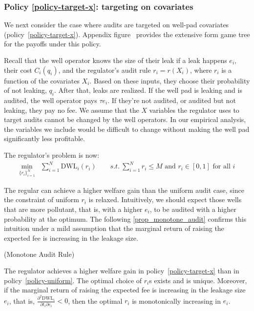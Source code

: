 \subsubsection{Policy \ref{policy-target-x}: targeting on covariates}

We next consider the case where audits are targeted on well-pad covariates (policy~\ref{policy-target-x}).
Appendix figure~\iftoggle{usexr}{\ref{fig:game-tree-target-x}}{A1} provides the extensive form game tree for the payoffs under this policy.

Recall that the well operator knows the size of their leak if a leak happens \(e_i\), their cost \(C_i(q_i)\), and the regulator's audit rule \(r_i = r(X_i)\), where \(r_i\) is a function of the covariates \(X_i\).
Based on these inputs, they choose their probability of not leaking, \(q_i\).
After that, leaks are realized.
If the well pad is leaking and is audited, the well operator pays \(\tau e_i\).
If they're not audited, or audited but not leaking, they pay no fee.
We assume that the \(X\) variables the regulator uses to target audits cannot be changed by the well operators.
In our empirical analysis, the variables we include would be difficult to change without making the well pad significantly less profitable.

The regulator's problem is now:
\begin{align*}
\min_{\{r_i\}^{N}_{i=1}} &  \sum^{N}_{i=1} \text{DWL}_i(r_i) \qquad
s.t.\ \sum^{N}_{i=1} r_i \leq M \text{ and } r_i \in [0, 1] \text{ for all } i
\end{align*}

The regular can achieve a higher welfare gain than the uniform audit case, since the constraint of uniform \(r_i\) is relaxed.
Intuitively, we should expect those wells that are more pollutant, that is, with a higher \(e_i\), to be audited with a higher probability at the optimum.
The following \autoref{prop_monotone_audit} confirms this intuition under a mild assumption that the marginal return of raising the expected fee is increasing in the leakage size.

\begin{proposition}{(Monotone Audit Rule)}
\label{prop_monotone_audit}

\noindent
The regulator achieves a higher welfare gain in policy~\ref{policy-target-x} than in policy~\ref{policy-uniform}.
The optimal choice of \(r_i\)s exists and is unique.
Moreover, if the marginal return of raising the expected fee is increasing in the leakage size \(e_i\), that is,
\(\frac{\partial^2 \text{DWL}_i}{\partial t_i \partial e_i} < 0\),
then the optimal \(r_i\) is monotonically increasing in \(e_i\).
\end{proposition}

